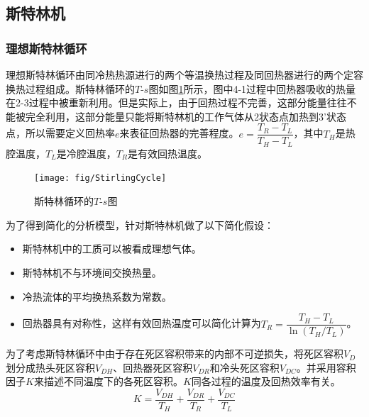 \subsection{斯特林机}
\label{sec:StirlingEngineModel}
\subsubsection{理想斯特林循环}
理想斯特林循环由同冷热热源进行的两个等温换热过程及同回热器进行的两个定容换热过程组成。斯特林循环的$T$-$s$图如图\ref{fig:StirlingCycle}所示，图中4-1过程中回热器吸收的热量在2-3过程中被重新利用。但是实际上，由于回热过程不完善，这部分能量往往不能被完全利用，这部分能量只能将斯特林机的工作气体从2状态点加热到3'状态点，所以需要定义回热率$e$来表征回热器的完善程度\cite{Formosa2010,Juhasz2010}。$e=\dfrac{T_R-T_L}{T_H-T_L}$，其中$T_H$是热腔温度，$T_L$是冷腔温度，$T_R$是有效回热温度。

\noindent \begin{figure}[htbp]
\begin{center}
	\texttt{[image: fig/StirlingCycle]}
	\caption{斯特林循环的$T$-$s$图}
	\label{fig:StirlingCycle}
\end{center}
\end{figure}

为了得到简化的分析模型，针对斯特林机做了以下简化假设：

\begin{itemize}
\item 斯特林机中的工质可以被看成理想气体。
\item 斯特林机不与环境间交换热量。
\item 冷热流体的平均换热系数为常数。
\item 回热器具有对称性，这样有效回热温度可以简化计算为$T_{R}=\dfrac{T_{H}-T_{L}}{\ln(T_{H}/T_{L})}$\cite{Formosa2010,Juhasz2010}。
\end{itemize}

为了考虑斯特林循环中由于存在死区容积带来的内部不可逆损失，将死区容积$V_D$划分成热头死区容积$V_{DH}$、回热器死区容积$V_{DR}$和冷头死区容积$V_{DC}$\cite{Duan2014}。并采用容积因子$K$来描述不同温度下的各死区容积。$K$同各过程的温度及回热效率有关。
\begin{equation}
	K = \frac{V_{DH}}{T_H} + \frac{V_{DR}}{T_R} + \frac{V_{DC}}{T_L}
\end{equation}

